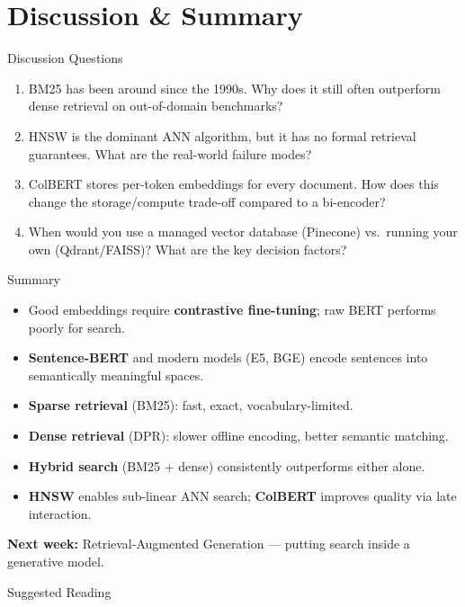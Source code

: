 \documentclass[aspectratio=169,10pt]{beamer}
\begin{document}
\section{Discussion \& Summary}
\begin{frame}{Discussion Questions}
  \begin{enumerate}
    \item BM25 has been around since the 1990s. Why does it still often outperform dense retrieval on out-of-domain benchmarks?
    \item HNSW is the dominant ANN algorithm, but it has no formal retrieval guarantees. What are the real-world failure modes?
    \item ColBERT stores per-token embeddings for every document. How does this change the storage/compute trade-off compared to a bi-encoder?
    \item When would you use a managed vector database (Pinecone) vs.\ running your own (Qdrant/FAISS)? What are the key decision factors?
  \end{enumerate}
\end{frame}

\begin{frame}{Summary}
  \begin{itemize}
    \item Good embeddings require \textbf{contrastive fine-tuning}; raw BERT performs poorly for search.
    \item \textbf{Sentence-BERT} and modern models (E5, BGE) encode sentences into semantically meaningful spaces.
    \item \textbf{Sparse retrieval} (BM25): fast, exact, vocabulary-limited.
    \item \textbf{Dense retrieval} (DPR): slower offline encoding, better semantic matching.
    \item \textbf{Hybrid search} (BM25 + dense) consistently outperforms either alone.
    \item \textbf{HNSW} enables sub-linear ANN search; \textbf{ColBERT} improves quality via late interaction.
  \end{itemize}
  \vspace{0.3em}
  \textbf{Next week:} Retrieval-Augmented Generation — putting search inside a generative model.
\end{frame}

\begin{frame}[allowframebreaks]{Suggested Reading}
  \nocite{reimers2019sentence, karpukhin2020dpr, khattab2020colbert, malkov2018hnsw}
  
\end{frame}
\end{document}
